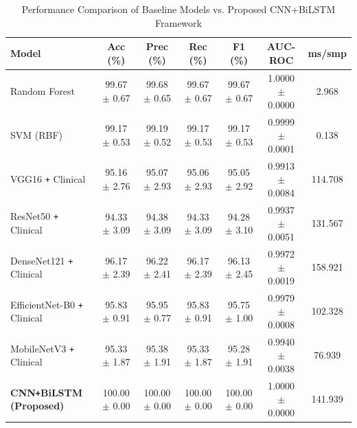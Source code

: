 \begin{table}[htbp]
\centering
\caption{Performance Comparison of Baseline Models vs. Proposed CNN+BiLSTM Framework}
\label{tab:comparison}
\begin{tabular}{lcccccc}
\toprule
\textbf{Model} & \textbf{Acc (\%)} & \textbf{Prec (\%)} & \textbf{Rec (\%)} & \textbf{F1 (\%)} & \textbf{AUC-ROC} & \textbf{ms/smp} \\
\midrule
Random Forest & 99.67 $\pm$ 0.67 & 99.68 $\pm$ 0.65 & 99.67 $\pm$ 0.67 & 99.67 $\pm$ 0.67 & 1.0000 $\pm$ 0.0000 & 2.968 \\
SVM (RBF) & 99.17 $\pm$ 0.53 & 99.19 $\pm$ 0.52 & 99.17 $\pm$ 0.53 & 99.17 $\pm$ 0.53 & 0.9999 $\pm$ 0.0001 & 0.138 \\
VGG16 \texttt{+} Clinical & 95.16 $\pm$ 2.76 & 95.07 $\pm$ 2.93 & 95.06 $\pm$ 2.93 & 95.05 $\pm$ 2.92 & 0.9913 $\pm$ 0.0084 & 114.708 \\
ResNet50 \texttt{+} Clinical & 94.33 $\pm$ 3.09 & 94.38 $\pm$ 3.09 & 94.33 $\pm$ 3.09 & 94.28 $\pm$ 3.10 & 0.9937 $\pm$ 0.0051 & 131.567 \\
DenseNet121 \texttt{+} Clinical & 96.17 $\pm$ 2.39 & 96.22 $\pm$ 2.41 & 96.17 $\pm$ 2.39 & 96.13 $\pm$ 2.45 & 0.9972 $\pm$ 0.0019 & 158.921 \\
EfficientNet-B0 \texttt{+} Clinical & 95.83 $\pm$ 0.91 & 95.95 $\pm$ 0.77 & 95.83 $\pm$ 0.91 & 95.75 $\pm$ 1.00 & 0.9979 $\pm$ 0.0008 & 102.328 \\
MobileNetV3 \texttt{+} Clinical & 95.33 $\pm$ 1.87 & 95.38 $\pm$ 1.91 & 95.33 $\pm$ 1.87 & 95.28 $\pm$ 1.91 & 0.9940 $\pm$ 0.0038 & 76.939 \\
\textbf{CNN\texttt{+}BiLSTM (Proposed)} & 100.00 $\pm$ 0.00 & 100.00 $\pm$ 0.00 & 100.00 $\pm$ 0.00 & 100.00 $\pm$ 0.00 & 1.0000 $\pm$ 0.0000 & 141.939 \\
\bottomrule
\end{tabular}
\end{table}
